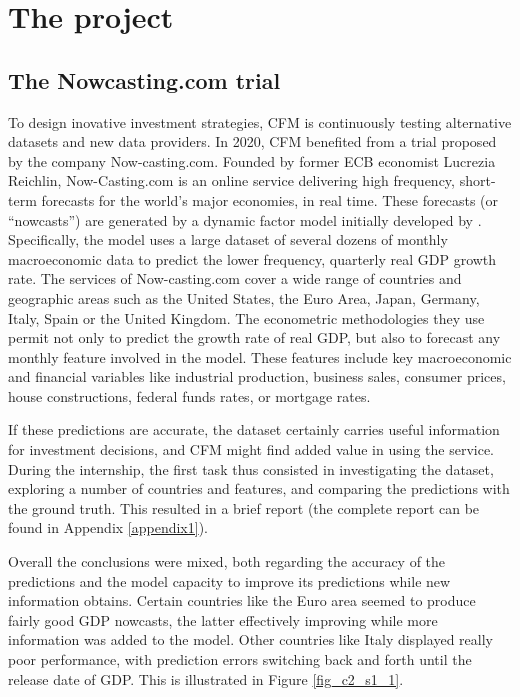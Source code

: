 \chapter{The project}
\label{chapter2}


\section{The Nowcasting.com trial}
\label{chapter2_section1}

To design inovative investment strategies, CFM is continuously testing alternative datasets and new data providers. In 2020, CFM benefited from a trial proposed by the company Now-casting.com. Founded by former ECB economist Lucrezia Reichlin, Now-Casting.com is an online service delivering high frequency, short-term forecasts for the world’s major economies, in real time. These forecasts (or ``nowcasts'') are generated by a dynamic factor model initially developed by \cite{Giannone2008}. Specifically, the model uses a large dataset of several dozens of monthly macroeconomic data to predict the lower frequency, quarterly real GDP growth rate. The services of Now-casting.com cover a wide range of countries and geographic areas such as the United States, the Euro Area, Japan, Germany, Italy, Spain or the United Kingdom. The econometric methodologies they use permit not only to predict the growth rate of real GDP, but also to forecast any monthly feature involved in the model. These features include key macroeconomic and financial variables like industrial production, business sales, consumer prices, house constructions, federal funds rates, or mortgage rates.

If these predictions are accurate, the dataset certainly carries useful information for investment decisions, and CFM might find added value in using the service. During the internship, the first task thus consisted in investigating the dataset, exploring a number of countries and features, and comparing the predictions with the ground truth. This resulted in a brief report (the complete report can be found in Appendix \ref{appendix1}).

Overall the conclusions were mixed, both regarding the accuracy of the predictions and the model capacity to improve its predictions while new information obtains. Certain countries like the Euro area seemed to produce fairly good GDP nowcasts, the latter effectively improving while more information was added to the model. Other countries like Italy displayed really poor performance, with prediction errors switching back and forth until the release date of GDP. This is illustrated in Figure \ref{fig_c2_s1_1}.

